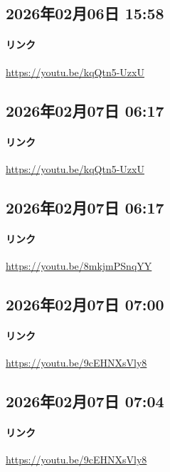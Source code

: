\subsection*{2026年02月06日 15:58}

\paragraph{リンク}
\url{https://youtu.be/kqQtn5-UzxU}

\subsection*{2026年02月07日 06:17}

\paragraph{リンク}
\url{https://youtu.be/kqQtn5-UzxU}

\subsection*{2026年02月07日 06:17}

\paragraph{リンク}
\url{https://youtu.be/8mkjmPSnqYY}

\subsection*{2026年02月07日 07:00}

\paragraph{リンク}
\url{https://youtu.be/9cEHNXsVly8}

\subsection*{2026年02月07日 07:04}

\paragraph{リンク}
\url{https://youtu.be/9cEHNXsVly8}

